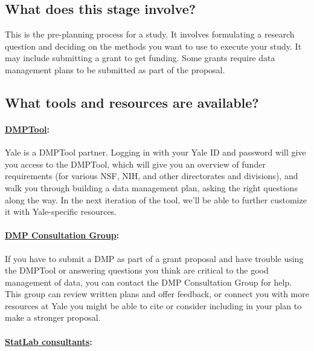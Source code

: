 \documentclass{tufte-handout}
\begin{document}
\subsection{What does this stage
involve?}\label{what-does-this-stage-involve}

This is the pre-planning process for a study. It involves formulating a
research question and deciding on the methods you want to use to execute
your study. It may include submitting a grant to get funding. Some
grants require data management plans to be submitted as part of the
proposal.

\subsection{What tools and resources are
available?}\label{what-tools-and-resources-are-available}

\paragraph{\href{https://dmp.cdlib.org/}{DMPTool}:}\label{dmptool}

Yale is a DMPTool partner. Logging in with your Yale ID and password
will give you access to the DMPTool, which will give you an overview of
funder requirements (for various NSF, NIH, and other directorates and
divisions), and walk you through building a data management plan, asking
the right questions along the way. In the next iteration of the tool,
we'll be able to further customize it with Yale-specific resources.

\paragraph{\href{http://csssi.yale.edu/dmp}{DMP Consultation
Group}:}\label{dmp-consultation-group}

If you have to submit a DMP as part of a grant proposal and have trouble
using the DMPTool or answering questions you think are critical to the
good management of data, you can contact the DMP Consultation Group for
help. This group can review written plans and offer feedback, or connect
you with more resources at Yale you might be able to cite or consider
including in your plan to make a stronger proposal.

\paragraph{\href{http://csssi.yale.edu/csssi-statistical-consultants-schedule}{StatLab
consultants}:}\label{statlab-consultants}
\end{document}
